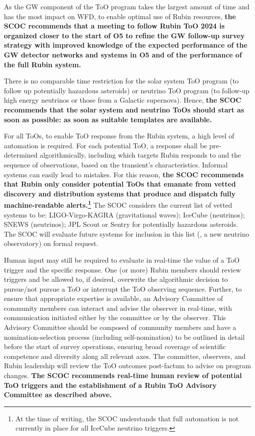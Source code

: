 As the GW component of the ToO program takes the largest amount of time and has the most impact on WFD, to enable optimal use of Rubin resources, {\bf the SCOC recommends that a meeting to follow Rubin ToO 2024 is organized closer to the start of O5 to refine the GW follow-up survey strategy with improved knowledge of the expected performance of the GW detector networks and systems in O5 and of the performance of the full Rubin system.}
%

There is no comparable time restriction for the solar system ToO program (to follow up potentially hazardous asteroids) or neutrino ToO program (to follow-up high energy neutrinos or those from a Galactic supernova). Hence, {\bf the SCOC recommends that the solar system and neutrino ToOs should start as soon as possible: as soon as suitable templates are available.} 



For all ToOs, to enable ToO response from the Rubin system, a high level of automation is required. For each potential ToO, a response shall be pre-determined algorithmically, including which targets Rubin responds to and the sequence of observations, based on the transient’s characteristics. Informal systems can easily lead to mistakes. For this reason, {\bf the SCOC recommends that Rubin only consider potential ToOs that emanate from vetted discovery and distribution systems that produce and dispatch fully machine-readable alerts.\footnote{At the time of writing, the SCOC understands that full automation is not currently in place for all IceCube neutrino triggers.}} The SCOC considers the current list of vetted systems to be: LIGO-Virgo-KAGRA (gravitational waves); IceCube (neutrinos); SNEWS (neutrinos); JPL Scout or Sentry for potentially hazardous asteroids. The SCOC will evaluate future systems for inclusion in this list (\eg , a new neutrino observatory) on formal request.

Human input may still be required to evaluate in real-time the value of a ToO trigger and the specific response.  One (or more) Rubin members %
should review triggers and be allowed to, if desired, overwrite the algorithmic decision to pursue/not pursue a ToO or interrupt the ToO observing sequence. Further, to ensure that appropriate expertise is available, an Advisory Committee of community members can interact and advise the observer in real-time, with communication initiated either by the committee or by the observer. 
This Advisory Committee should be composed of community members and have a nomination-selection process (including self-nomination) to be outlined in detail before the start of survey operations, ensuring broad coverage of scientific competence and diversity along all relevant axes.
The committee, observers, and Rubin leadership will review the ToO outcomes post-factum to advise on program changes. 
{\bf The SCOC recommends real-time human review of potential ToO triggers and the establishment of a Rubin ToO Advisory Committee as described above.}



